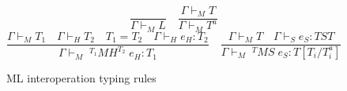 \begin{figure}
\[
\frac{}{\Gamma\vdash_{M}L}
\quad
\frac{\Gamma\vdash_{M}T}{\Gamma\vdash_{M}T^{a}}
\]
\bigskip
\[
\frac{\Gamma\vdash_{M}T_{1}\quad\Gamma\vdash_{H}T_{2}\quad T_{1}=T_{2}\quad\Gamma\vdash_{H}e_{H}:T_{2}}{\Gamma\vdash_{M}\;^{T_{1}}MH^{T_{2}}\;e_{H}:T_{1}}
\quad
\frac{\Gamma\vdash_{M}T\quad\Gamma\vdash_{S}e_{S}:TST}{\Gamma\vdash_{M}\;^{T}MS\;e_{S}:T[T_{i}/T^{a}_{i}]}
\]
\caption{ML interoperation typing rules}
\label{mitr}
\end{figure}
